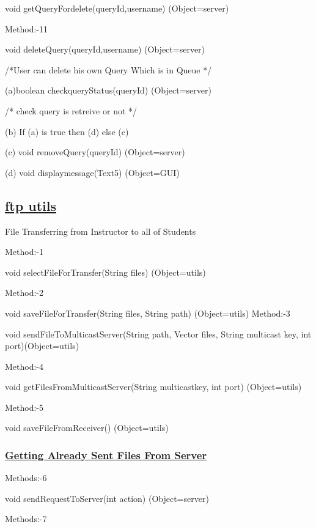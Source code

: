 \documentclass{article}
\begin{document}
 void getQueryFordelete(queryId,username)                 (Object=server) 

Method:-11 

 void deleteQuery(queryId,username)                        (Object=server) 
 
/*User can delete his own Query Which is in Queue */          

(a)boolean  checkqueryStatus(queryId)        (Object=server) 

    /* check  query is retreive or not  */ 

            (b)  If  (a) is true then (d) else (c) 

            (c) void removeQuery(queryId)                        (Object=server) 

            (d) void displaymessage(Text5)                       (Object=GUI)
\subsection*{\underline{ftp utils}}

File Transferring from Instructor to all of Students 

Method:-1 

	void selectFileForTransfer(String files)                   (Object=utils) 

Method:-2  

	void saveFileForTransfer(String files, String path)            (Object=utils) 
Method:-3 

void sendFileToMulticastServer(String path, Vector files, String multicast key, int port)(Object=utils) 

Method:-4 

	void getFilesFromMulticastServer(String multicastkey, int port)   (Object=utils) 

Method:-5 


	void saveFileFromReceiver()  (Object=utils)
\begin{center}

\label{figure:brihSync_ftp.latex}
\end{center}
\subsubsection*{\underline{Getting Already Sent Files From Server}}


Methods:-6    

void sendRequestToServer(int action)   (Object=server) 

Methods:-7    
\end{document}

